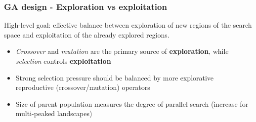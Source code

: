 \documentclass{beamer}
\begin{document}
			\begin{frame}
				\frametitle{GA design - Exploration vs exploitation}
				High-level goal: effective balance between exploration of new regions of the search space and exploitation of the already explored regions.
				
				\vspace{5mm}
				
				\begin{itemize}
					\item \textit{Crossover} and \textit{mutation} are the primary source of \textbf{exploration}, while \textit{selection} controls \textbf{exploitation}
					\item Strong selection pressure should be balanced by more explorative reproductive (crossover/mutation) operators
					\item Size of parent population measures the degree of parallel search (increase for multi-peaked landscapes)
				\end{itemize}
				
			\end{frame}
			
			
	
\end{document}
